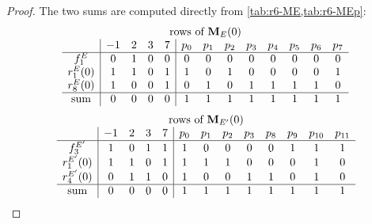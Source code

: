 \begin{proof}
The two sums are computed directly from \cref{tab:r6-ME,tab:r6-MEp}:
\[
\begin{array}{c|cccc|cccccccc}
\multicolumn{13}{c}{\text{rows of }\mathbf M_E(0)}\\
 & -1 & 2 & 3 & 7 & p_0 & p_1 & p_2 & p_3 & p_4 & p_5 & p_6 & p_7\\
\hline
f^E_1 & 0 & 1 & 0 & 0 & 0 & 0 & 0 & 0 & 0 & 0 & 0 & 0 \\
r^{E}_1(0) & 1 & 1 & 0 & 1 & 1 & 0 & 1 & 0 & 0 & 0 & 0 & 1 \\
r^{E}_8(0) & 1 & 0 & 0 & 1 & 0 & 1 & 0 & 1 & 1 & 1 & 1 & 0 \\
\hline
\text{sum} & 0 & 0 & 0 & 0 & 1 & 1 & 1 & 1 & 1 & 1 & 1 & 1
\end{array}
\]
\[
\begin{array}{c|cccc|cccccccc}
\multicolumn{13}{c}{\text{rows of }\mathbf M_{E'}(0)}\\
 & -1 & 2 & 3 & 7 & p_0 & p_1 & p_2 & p_3 & p_8 & p_9 & p_{10} & p_{11}\\
\hline
f^{E'}_3 & 1 & 0 & 1 & 1 & 1 & 0 & 0 & 0 & 0 & 1 & 1 & 1 \\
r^{E'}_1(0) & 1 & 1 & 0 & 1 & 1 & 1 & 1 & 0 & 0 & 0 & 1 & 0 \\
r^{E'}_4(0) & 0 & 1 & 1 & 0 & 1 & 0 & 0 & 1 & 1 & 0 & 1 & 0 \\
\hline
\text{sum} & 0 & 0 & 0 & 0 & 1 & 1 & 1 & 1 & 1 & 1 & 1 & 1
\end{array}
\]


\end{proof}
